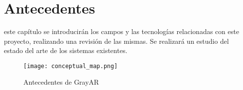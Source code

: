 \chapter{Antecedentes}
\label{chap:antecedentes}

 este capítulo se introducirán los campos y las tecnologías relacionadas con este
proyecto, realizando una revisión de las mismas. Se realizará un estudio del estado del
arte de los sistemas existentes.

\begin{figure}[h!] 
  \centering
  \texttt{[image: conceptual\_map.png]}
  \caption{Antecedentes de GrayAR}
  \label{fig:antecedentes}
\end{figure}





